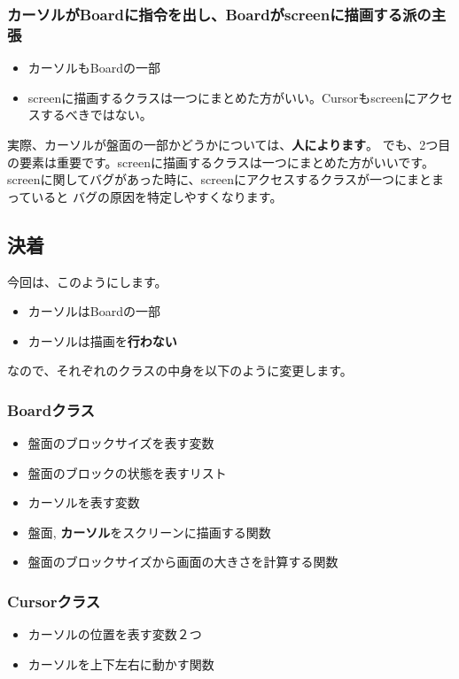 \documentclass[12pt, a4paper, dvipdfmx]{book}
\begin{document}
\subsubsection{カーソルがBoardに指令を出し、Boardがscreenに描画する派の主張}
\begin{itemize}
  \item カーソルもBoardの一部
  \item screenに描画するクラスは一つにまとめた方がいい。Cursorもscreenにアクセスするべきではない。
\end{itemize}
実際、カーソルが盤面の一部かどうかについては、\textbf{人によります}。
でも、2つ目の要素は重要です。screenに描画するクラスは一つにまとめた方がいいです。
screenに関してバグがあった時に、screenにアクセスするクラスが一つにまとまっていると
バグの原因を特定しやすくなります。

\subsection{決着}
今回は、このようにします。
\begin{itemize}
  \item カーソルはBoardの一部
  \item カーソルは描画を\textbf{行わない}
\end{itemize}
なので、それぞれのクラスの中身を以下のように変更します。
\subsubsection{Boardクラス}
\begin{itemize}
  \item 盤面のブロックサイズを表す変数
  \item 盤面のブロックの状態を表すリスト
  \item カーソルを表す変数
  \item 盤面, \textbf{カーソル}をスクリーンに描画する関数
  \item 盤面のブロックサイズから画面の大きさを計算する関数
\end{itemize}

\subsubsection{Cursorクラス}
\begin{itemize}
  \item カーソルの位置を表す変数２つ
  \item カーソルを上下左右に動かす関数
\end{itemize}
\end{document}
